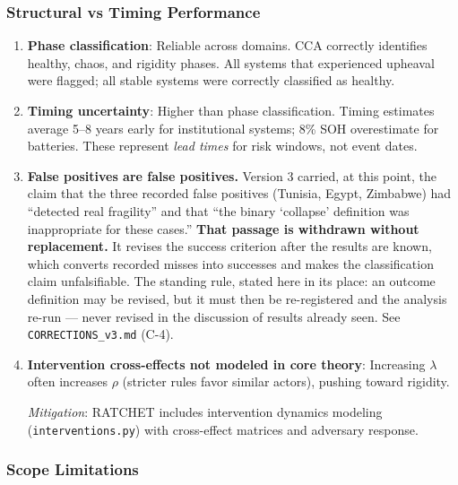 \documentclass[11pt,a4paper]{article}
\theoremstyle{definition}
\theoremstyle{remark}
\begin{document}
\subsubsection{Structural vs Timing Performance}

\begin{enumerate}
    \item \textbf{Phase classification}: Reliable across domains. CCA correctly identifies healthy, chaos, and rigidity phases. All systems that experienced upheaval were flagged; all stable systems were correctly classified as healthy.

    \item \textbf{Timing uncertainty}: Higher than phase classification. Timing estimates average 5--8 years early for institutional systems; 8\% SOH overestimate for batteries. These represent \textit{lead times} for risk windows, not event dates.

    \item \textbf{False positives are false positives.} Version 3 carried, at this point, the claim that the three recorded false positives (Tunisia, Egypt, Zimbabwe) had ``detected real fragility'' and that ``the binary `collapse' definition was inappropriate for these cases.'' \textbf{That passage is withdrawn without replacement.} It revises the success criterion after the results are known, which converts recorded misses into successes and makes the classification claim unfalsifiable. The standing rule, stated here in its place: an outcome definition may be revised, but it must then be re-registered and the analysis re-run --- never revised in the discussion of results already seen. See \texttt{CORRECTIONS\_v3.md} (C-4).

    \item \textbf{Intervention cross-effects not modeled in core theory}: Increasing $\lambda$ often increases $\rho$ (stricter rules favor similar actors), pushing toward rigidity.

    \textit{Mitigation}: RATCHET includes intervention dynamics modeling (\texttt{interventions.py}) with cross-effect matrices and adversary response.
\end{enumerate}

\subsubsection{Scope Limitations}
\end{document}
